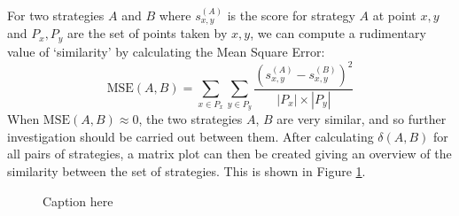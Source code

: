 For two strategies $A$ and $B$ where $s_{x, y}^{(A)}$ is the score for strategy $A$ at point $x, y$ and $P_x, P_y$ are the set of points taken by $x, y$, we can compute a rudimentary value of `similarity' by calculating the Mean Square Error:
$$
\text{MSE}(A, B) = \sum_{x \in P_x} \sum_{y \in P_y} \frac{(s_{x, y}^{(A)} - s_{x, y}^{(B)})^2}{|P_x|\times|P_y|}
$$
When $\text{MSE}(A, B) \approx 0$, the two strategies $A$, $B$ are very similar, and so further investigation should be carried out between them.
After calculating $\delta(A, B)$ for all pairs of strategies, a matrix plot can then be created giving an overview of the similarity between the set of strategies.
This is shown in Figure \ref{fig:mean_squares}.

\begin{figure}[htbp!]
    \caption{Caption here}
    \label{fig:mean_squares}
\end{figure}
